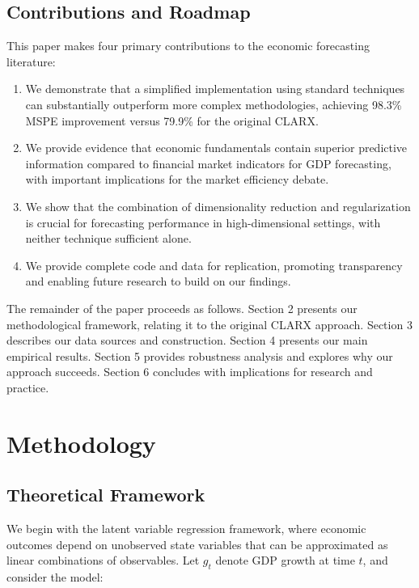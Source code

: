 \documentclass[11pt,letterpaper]{article}
\theoremstyle{plain}
\theoremstyle{definition}
\theoremstyle{remark}
\begin{document}
\subsection{Contributions and Roadmap}

This paper makes four primary contributions to the economic forecasting literature:

\begin{enumerate}
\item We demonstrate that a simplified implementation using standard techniques can substantially outperform more complex methodologies, achieving 98.3\% MSPE improvement versus 79.9\% for the original CLARX.

\item We provide evidence that economic fundamentals contain superior predictive information compared to financial market indicators for GDP forecasting, with important implications for the market efficiency debate.

\item We show that the combination of dimensionality reduction and regularization is crucial for forecasting performance in high-dimensional settings, with neither technique sufficient alone.

\item We provide complete code and data for replication, promoting transparency and enabling future research to build on our findings.
\end{enumerate}

The remainder of the paper proceeds as follows. Section 2 presents our methodological framework, relating it to the original CLARX approach. Section 3 describes our data sources and construction. Section 4 presents our main empirical results. Section 5 provides robustness analysis and explores why our approach succeeds. Section 6 concludes with implications for research and practice.

\section{Methodology}

\subsection{Theoretical Framework}

We begin with the latent variable regression framework, where economic outcomes depend on unobserved state variables that can be approximated as linear combinations of observables. Let $g_t$ denote GDP growth at time $t$, and consider the model:
\end{document}
